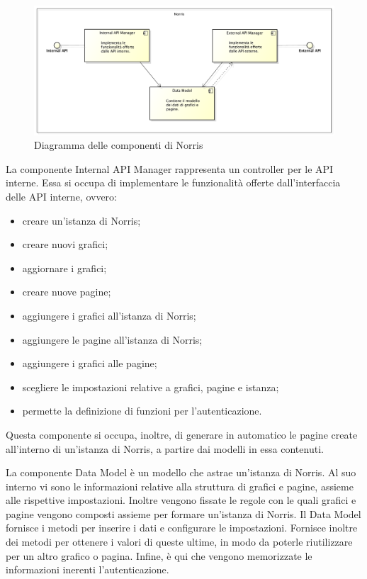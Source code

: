 
	\begin{figure}[H]\centering
        \includegraphics[width=\textwidth]{SpecificaTecnica/Pics/ComponentiNorris}
        \caption{Diagramma delle componenti di Norris}
    \end{figure}



			La componente Internal API Manager rappresenta un controller per le API interne. Essa si occupa di implementare le funzionalità offerte dall'interfaccia delle API interne, ovvero:
			\begin{itemize}
				\item creare un'istanza di Norris;
				\item creare nuovi grafici;
				\item aggiornare i grafici;
				\item creare nuove pagine;
				\item aggiungere i grafici all'istanza di Norris;
				\item aggiungere le pagine all'istanza di Norris;
				\item aggiungere i grafici alle pagine;
				\item scegliere le impostazioni relative a grafici, pagine e istanza;
				\item permette la definizione di funzioni per l'autenticazione.
			\end{itemize}
		Questa componente si occupa, inoltre, di generare in automatico le pagine create all'interno di un'istanza di Norris, a partire dai modelli in essa contenuti.

			La componente Data Model è un modello che astrae un'istanza di Norris. Al suo interno vi sono le informazioni relative alla struttura di grafici e pagine, assieme alle rispettive impostazioni. Inoltre vengono fissate le regole con le quali grafici e pagine vengono composti assieme per formare un'istanza di Norris. Il Data Model fornisce i metodi per inserire i dati e configurare le impostazioni. Fornisce inoltre dei metodi per ottenere i valori di queste ultime, in modo da poterle riutilizzare per un altro grafico o pagina. Infine, è qui che vengono memorizzate le informazioni inerenti l'autenticazione.

